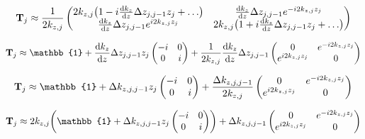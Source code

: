 \begin{align*}
	\vb{T}_j                                                       & \approx \frac{1}{2k_{z,j}}\pmqty{
	2k_{z,j}\pqty{1 - i\dv{k_{z}}{z} \Delta z_{j,j-1}z_j + \ldots} &
	\dv{k_{z}}{z} \Delta z_{j,j-1}e^{-i2k_{z,j}z_j}                                                    \\
	\dv{k_{z}}{z} \Delta z_{j,j-1}e^{ i2k_{z,j}z_j}                &
	2k_{z,j}\pqty{1 +  i\dv{k_{z}}{z} \Delta z_{j,j-1}z_j + \ldots}
	}                                                                                                  \\
\end{align*}

\begin{align*}
	\vb{T}_j                                       & \approx \mathbb{1}
	+ \dv{k_{z}}{z} \Delta z_{j,j-1} z_j \pmqty{-i & 0                  \\ 0 & i}
	+ \frac{1}{2k_{z,j}}\dv{k_{z}}{z} \Delta z_{j,j-1}\pmqty{
	0                                              &
	e^{-i2k_{z,j}z_j}                                                   \\
	e^{ i2k_{z,j}z_j}                              &
	0}                                                                  \\
\end{align*}

\begin{align*}
	\vb{T}_j                           & \approx \mathbb{1}
	+ \Delta k_{z,j,j-1} z_j \pmqty{-i & 0                  \\ 0 & i}
	+ \frac{\Delta k_{z,j,j-1}}{2k_{z,j}}\pmqty{
	0                                  &
	e^{-i2k_{z,j}z_j}                                       \\
	e^{ i2k_{z,j}z_j}                  &
	0}                                                      \\
\end{align*}

\begin{align*}
	\vb{T}_j                           & \approx2k_{z,j} \pqty{\mathbb{1}
	+ \Delta k_{z,j,j-1} z_j \pmqty{-i & 0                                \\ 0 & i}}
	+ \Delta k_{z,j,j-1}\pmqty{
	0                                  &
	e^{-i2k_{z,j}z_j}                                                     \\
	e^{ i2k_{z,j}z_j}                  &
	0}                                                                    \\
\end{align*}

